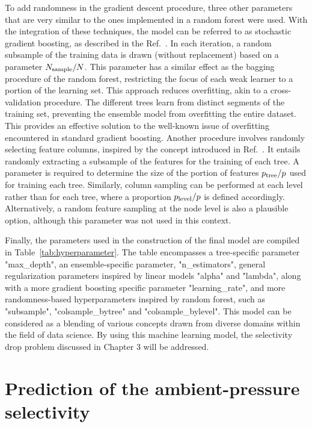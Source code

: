 \documentclass[main]{subfiles}
\begin{document}
To add randomness in the gradient descent procedure, three other parameters that are very similar to the ones implemented in a random forest were used. With the integration of these techniques, the model can be referred to as stochastic gradient boosting, as described in the Ref.~\cite{Friedman2002}. In each iteration, a random subsample of the training data is drawn (without replacement) based on a parameter $N_{\text{sample}}/N$. This parameter has a similar effect as the bagging procedure of the random forest, restricting the focus of each weak learner to a portion of the learning set. This approach reduces overfitting, akin to a cross-validation procedure. The different trees learn from distinct segments of the training set, preventing the ensemble model from overfitting the entire dataset. This provides an effective solution to the well-known issue of overfitting encountered in standard gradient boosting. Another procedure involves randomly selecting feature columns, inspired by the concept introduced in Ref.~\cite{Tin_Kam_Ho_1998}. It entails randomly extracting a subsample of the features for the training of each tree. A parameter is required to determine the size of the portion of features  $p_{\text{tree}}/p$ used for training each tree. Similarly, column sampling can be performed at each level rather than for each tree, where a proportion $p_{\text{level}}/p$ is defined accordingly. Alternatively, a random feature sampling at the node level is also a plausible option, although this parameter was not used in this context.

Finally, the parameters used in the construction of the final model are compiled in Table~\ref{tab:hyperparameter}. The table encompasses a tree-specific parameter "max\_depth", an ensemble-specific parameter, "n\_estimators", general regularization parameters inspired by linear models "alpha" and "lambda", along with a more gradient boosting specific parameter "learning\_rate", and more randomness-based hyperparameters inspired by random forest, such as "subsample", "colsample\_bytree" and "colsample\_bylevel". This model can be considered as a blending of various concepts drawn from diverse domains within the field of data science. By using this machine learning model, the selectivity drop problem discussed in Chapter 3 will be addressed.

\section{Prediction of the ambient-pressure selectivity}
\end{document}
